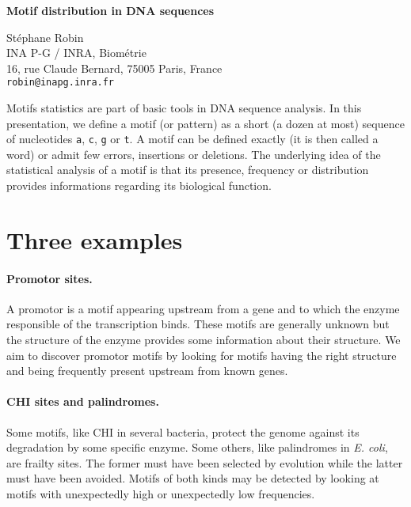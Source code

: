 \documentclass[11pt,a4paper,french]{article}
\begin{document}

\begin{center}
  {\Large \bf Motif distribution in DNA sequences}

  {\large St\'ephane {\sc Robin} \\
  INA P-G / INRA, Biom\'etrie \\
  16, rue Claude Bernard, 75005 Paris, {\sc France} \\
  {\tt robin@inapg.inra.fr}}

\end{center}

Motifs statistics are part of basic tools in DNA sequence analysis.
In this presentation, we define a motif (or pattern) as a short (a
dozen at most) sequence of nucleotides {\tt a}, {\tt c}, {\tt g} or
{\tt t}.  A motif can be defined exactly (it is then called a word) or
admit few errors, insertions or deletions. The underlying idea of the
statistical analysis of a motif is that its presence, frequency or
distribution provides informations regarding its biological function.

\section*{Three examples}

\paragraph{Promotor sites.}
A promotor is a motif appearing upstream from a gene and to which the
enzyme responsible of the transcription binds. These motifs are
generally unknown but the structure of the enzyme provides some
information about their structure. We aim to discover promotor motifs
by looking for motifs having the right structure and being frequently
present upstream from known genes.

\paragraph{CHI sites and palindromes.}
Some motifs, like CHI in several bacteria, protect the genome against
its degradation by some specific enzyme. Some others, like palindromes
in {\em E. coli}, are frailty sites. The former must have been
selected by evolution while the latter must have been avoided. Motifs
of both kinds may be detected by looking at motifs with unexpectedly
high or unexpectedly low frequencies.
\end{document}
